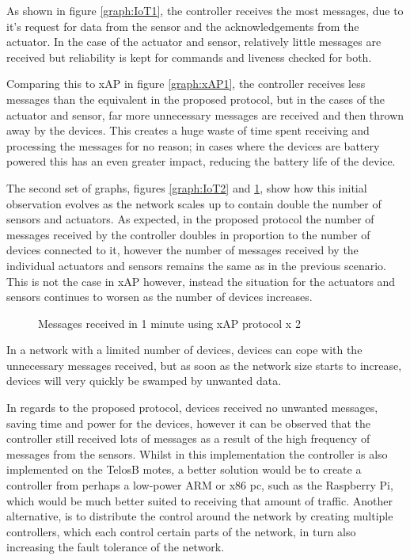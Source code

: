 As shown in figure \ref{graph:IoT1}, the controller receives the most messages, due to it's request for data from the sensor and the acknowledgements from the actuator. In the case of the actuator and sensor, relatively little messages are received but reliability is kept for commands and liveness checked for both. 

Comparing this to xAP in figure \ref{graph:xAP1}, the controller receives less messages than the equivalent in the proposed protocol, but in the cases of the actuator and sensor, far more unnecessary messages are received and then thrown away by the devices. This creates a huge waste of time spent receiving and processing the messages for no reason; in cases where the devices are battery powered this has an even greater impact, reducing the battery life of the device.

The second set of graphs, figures \ref{graph:IoT2} and \ref{graph:xAP2}, show how this initial observation evolves as the network scales up to contain double the number of sensors and actuators. As expected, in the proposed protocol the number of messages received by the controller doubles in proportion to the number of devices connected to it, however the number of messages received by the individual actuators and sensors remains the same as in the previous scenario. This is not the case in xAP however, instead the situation for the actuators and sensors continues to worsen as the number of devices increases.
\begin{figure}[h]
\begin{center}
\begin{minipage}{.5\textwidth}

\caption{Messages received in 1 minute using IoT protocol x 2}
\label{graph:IoT2}
\end{minipage}%
\begin{minipage}{.5\textwidth}

\caption{Messages received in 1 minute using xAP protocol x 2}
\label{graph:xAP2}
\end{minipage}
\end{center}
\end{figure}

In a network with a limited number of devices, devices can cope with the unnecessary messages received, but as soon as the network size starts to increase, devices will very quickly be swamped by unwanted data.

In regards to the proposed protocol, devices received no unwanted messages, saving time and power for the devices, however it can be observed that the controller still received lots of messages as a result of the high frequency of messages from the sensors. Whilst in this implementation the controller is also implemented on the TelosB motes, a better solution would be to create a controller from perhaps a low-power ARM or x86 pc, such as the Raspberry Pi, which would be much better suited to receiving that amount of traffic. Another alternative, is to distribute the control around the network by creating multiple controllers, which each control certain parts of the network, in turn also increasing the fault tolerance of the network.

